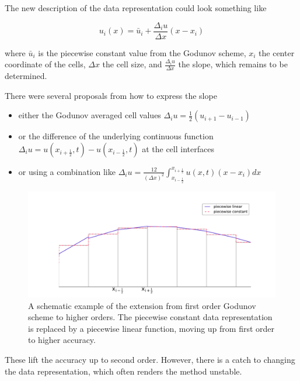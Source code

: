 The new description of the data representation could look something like

\begin{equation}
  u_{i}(x) = \bar{u}_{i} + \frac{\Delta_{i} u}{\Delta x} (x - x_{i})
\end{equation}

where $\bar{u}_{i}$ is the piecewise constant value from the Godunov scheme, $x_{i}$ the center coordinate of the cells, $\Delta x$ the cell size, and $\frac{\Delta_{i} u}{\Delta x}$ the slope, which remains to be determined.

There were several proposals from \citet{MUSCL_1, MUSCL_2} how to express the slope

\begin{itemize}
  \item either the Godunov averaged cell values $\Delta_{i} u = \frac{1}{2}(u_{i+1} - u_{i-1})$
  \item or the difference of the underlying continuous function $\Delta_{i} u = u(x_{i+\frac{1}{2}}, t) - u(x_{i-\frac{1}{2}}, t)$ at the cell interfaces
  \item or using a combination like $\Delta_{i} u = \frac{12}{(\Delta x)^{2}}\int_{x_{i-\frac{1}{2}}}^{x_{i+\frac{1}{2}}} u(x, t) (x - x_{i}) dx$
\end{itemize}

\begin{figure}[ht]
 \centering
 \includegraphics[width=\textwidth]{Figures/pw_linear}
 \captionsetup{justification=justified,singlelinecheck=false,width=\linewidth}
 \decoRule
 \caption[Piecewise linear function]{A schematic example of the extension from first order Godunov scheme to higher orders.
                                     The piecewise constant data representation is replaced by a piecewise linear function, moving up from first order to higher accuracy.}
 \label{fig:Piecewise_linear}
\end{figure}

These lift the accuracy up to second order.
However, there is a catch to changing the data representation, which often renders the method unstable.

